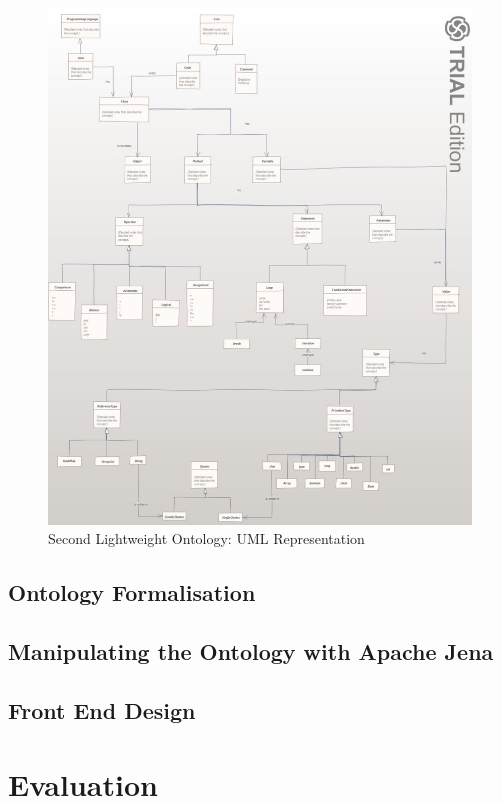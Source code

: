 \documentclass[12pt]{report}
\begin{document}
	\begin{figure}[h!]
	    \centering
	    \includegraphics[width=\textwidth]{UML.JPG}
	    \caption{Second Lightweight Ontology: UML Representation}
	    \label{fig:uml}
	\end{figure}
	\clearpage
	
	\section{Ontology Formalisation}
	\section{Manipulating the Ontology with Apache Jena}
	\section{Front End Design}
	
	\chapter{Evaluation}
	
\end{document}
